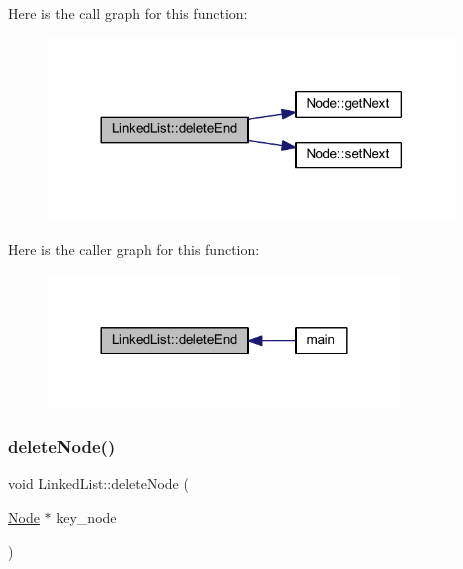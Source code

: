 Here is the call graph for this function\+:
\nopagebreak
\begin{figure}[H]
\begin{center}
\leavevmode
\includegraphics[width=305pt]{class_linked_list_ab624ff78c70aaa517a3a98a4e7fec288_cgraph}
\end{center}
\end{figure}
Here is the caller graph for this function\+:
\nopagebreak
\begin{figure}[H]
\begin{center}
\leavevmode
\includegraphics[width=264pt]{class_linked_list_ab624ff78c70aaa517a3a98a4e7fec288_icgraph}
\end{center}
\end{figure}
\mbox{\label{class_linked_list_a9a53a4d26d1c757f3d526db3fa43c2f8}} 
\subsubsection{\texorpdfstring{delete\+Node()}{deleteNode()}}
{\footnotesize\ttfamily void Linked\+List\+::delete\+Node (\begin{DoxyParamCaption}\item[{\hyperlink{class_node}{Node} $\ast$}]{key\+\_\+node }\end{DoxyParamCaption})}

